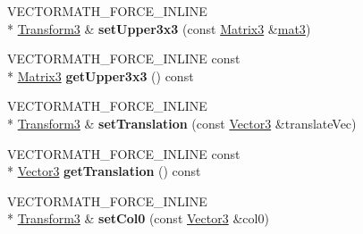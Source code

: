 \begin{DoxyCompactItemize}
\item 
\hypertarget{class_vectormath_1_1_aos_1_1_transform3_a6a737af9271bf0c90fc735946e33d3cc}{V\+E\+C\+T\+O\+R\+M\+A\+T\+H\+\_\+\+F\+O\+R\+C\+E\+\_\+\+I\+N\+L\+I\+N\+E \\*
\hyperlink{class_vectormath_1_1_aos_1_1_transform3}{Transform3} \& {\bfseries set\+Upper3x3} (const \hyperlink{class_vectormath_1_1_aos_1_1_matrix3}{Matrix3} \&\hyperlink{classmat3}{mat3})}\label{class_vectormath_1_1_aos_1_1_transform3_a6a737af9271bf0c90fc735946e33d3cc}

\item 
\hypertarget{class_vectormath_1_1_aos_1_1_transform3_a66af739439da8edfbf471a66f7fa1ec1}{V\+E\+C\+T\+O\+R\+M\+A\+T\+H\+\_\+\+F\+O\+R\+C\+E\+\_\+\+I\+N\+L\+I\+N\+E const \\*
\hyperlink{class_vectormath_1_1_aos_1_1_matrix3}{Matrix3} {\bfseries get\+Upper3x3} () const }\label{class_vectormath_1_1_aos_1_1_transform3_a66af739439da8edfbf471a66f7fa1ec1}

\item 
\hypertarget{class_vectormath_1_1_aos_1_1_transform3_aff8919d4868a4e1edc4556c1228cb821}{V\+E\+C\+T\+O\+R\+M\+A\+T\+H\+\_\+\+F\+O\+R\+C\+E\+\_\+\+I\+N\+L\+I\+N\+E \\*
\hyperlink{class_vectormath_1_1_aos_1_1_transform3}{Transform3} \& {\bfseries set\+Translation} (const \hyperlink{class_vectormath_1_1_aos_1_1_vector3}{Vector3} \&translate\+Vec)}\label{class_vectormath_1_1_aos_1_1_transform3_aff8919d4868a4e1edc4556c1228cb821}

\item 
\hypertarget{class_vectormath_1_1_aos_1_1_transform3_a490a441f8e15ea928bf3bd647bc7d1b8}{V\+E\+C\+T\+O\+R\+M\+A\+T\+H\+\_\+\+F\+O\+R\+C\+E\+\_\+\+I\+N\+L\+I\+N\+E const \\*
\hyperlink{class_vectormath_1_1_aos_1_1_vector3}{Vector3} {\bfseries get\+Translation} () const }\label{class_vectormath_1_1_aos_1_1_transform3_a490a441f8e15ea928bf3bd647bc7d1b8}

\item 
\hypertarget{class_vectormath_1_1_aos_1_1_transform3_a11fcad93aede64b61f4c0a9c671a2951}{V\+E\+C\+T\+O\+R\+M\+A\+T\+H\+\_\+\+F\+O\+R\+C\+E\+\_\+\+I\+N\+L\+I\+N\+E \\*
\hyperlink{class_vectormath_1_1_aos_1_1_transform3}{Transform3} \& {\bfseries set\+Col0} (const \hyperlink{class_vectormath_1_1_aos_1_1_vector3}{Vector3} \&col0)}\label{class_vectormath_1_1_aos_1_1_transform3_a11fcad93aede64b61f4c0a9c671a2951}


\end{DoxyCompactItemize}
